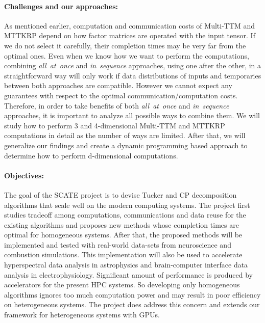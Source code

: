 \documentclass[a4paper,11pt]{article}
\begin{document}
    \vspace*{-0.325cm}\paragraph{Challenges and our approaches:} As mentioned earlier, computation and communication costs of Multi-TTM and MTTKRP depend on how factor matrices are operated with the input tensor. If we do not select it carefully, their completion times may be very far from the optimal ones. Even when we know how we want to perform the computations, combining \emph{all~at~once} and \emph{in~sequence} approaches, using one after the other, in a straightforward way will only work if data distributions of inputs and temporaries between both approaches are compatible. However we cannot expect any guarantees with respect to the optimal communication/computation costs. Therefore, in order to take benefits of both \emph{all~at~once} and \emph{in~sequence} approaches, it is important to analyze all possible ways to combine them. We will study how to perform 3 and 4-dimensional Multi-TTM and MTTKRP computations in detail as the number of ways are limited. After that, we will generalize our findings and create a dynamic programming based approach to determine how to perform d-dimensional computations.
    
   	\vspace*{-0.325cm}\paragraph{Objectives:} The goal of the SCATE project is to devise Tucker and CP decomposition algorithms that scale well on the modern computing systems. The project first studies tradeoff among computations, communications and data reuse for the existing algorithms and proposes new methods whose completion times are optimal for homogeneous systems. After that, the proposed methods will be implemented and tested with real-world data-sets from neuroscience and combustion simulations. This implementation will also be used to accelerate hyperspectral data analysis in astrophysics and brain-computer interface data analysis in electrophysiology. Significant amount of performance is produced by accelerators for the present HPC systems. So developing only homogeneous algorithms ignores too much computation power and may result in poor efficiency on heterogeneous systems. The project does address this concern and extends our framework for heterogeneous systems with GPUs.
   	
\end{document}
